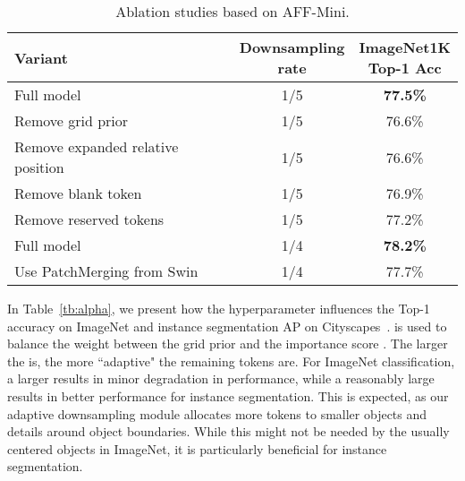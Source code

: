 \documentclass[10pt,twocolumn,letterpaper]{article}
\begin{document}
\begin{table}
\begin{center}
\begin{footnotesize}
\begin{tabular}{lcc}
Variant & \makecell{Downsampling\\rate} & \makecell{ImageNet1K\\Top-1 Acc}
\\\hline
Full model & 1/5 & \textbf{77.5\%}\\
Remove grid prior & 1/5 & 76.6\%\\
Remove expanded relative position & 1/5 & 76.6\%\\
Remove blank token & 1/5 & 76.9\%\\
Remove reserved tokens & 1/5 & 77.2\%\\
\hline
Full model & 1/4 & \textbf{78.2\%}\\
Use PatchMerging from Swin~\cite{swin} & 1/4 & 77.7\%\\
\hline 
\end{tabular}
\end{footnotesize}
\end{center}
\vspace{-0.6cm}
\caption{Ablation studies based on AFF-Mini. 
}
\vskip -0.2in
\label{tb:ablation}
\end{table}


In Table~\ref{tb:alpha}, we present how the hyperparameter  influences the Top-1 accuracy on ImageNet and instance segmentation AP on Cityscapes~\cite{cityscapes}. 
 is used to balance the weight between the grid prior  and the importance score . The larger the  is, the more ``adaptive" the remaining tokens are. 
For ImageNet classification, a larger  results in minor degradation in performance, while a reasonably large  results in better performance for instance segmentation. This is expected, as our adaptive downsampling module allocates more tokens to smaller objects and details around object boundaries. While this might not be needed by the usually centered objects in ImageNet, it is particularly beneficial for instance segmentation. 
\end{document}
